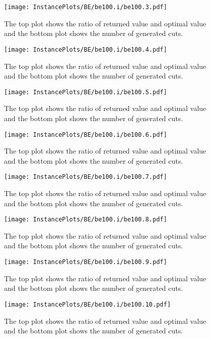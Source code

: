 \documentclass[10pt,a4paper]{article}
\begin{document}
\begin{figure}[H]
\texttt{[image: InstancePlots/BE/be100.i/be100.3.pdf]}
\caption{The top plot shows the ratio of returned value and optimal value     and the bottom plot shows the number of generated cuts.}
\end{figure}

\begin{figure}[H]
\texttt{[image: InstancePlots/BE/be100.i/be100.4.pdf]}
\caption{The top plot shows the ratio of returned value and optimal value     and the bottom plot shows the number of generated cuts.}
\end{figure}

\begin{figure}[H]
\texttt{[image: InstancePlots/BE/be100.i/be100.5.pdf]}
\caption{The top plot shows the ratio of returned value and optimal value     and the bottom plot shows the number of generated cuts.}
\end{figure}

\begin{figure}[H]
\texttt{[image: InstancePlots/BE/be100.i/be100.6.pdf]}
\caption{The top plot shows the ratio of returned value and optimal value     and the bottom plot shows the number of generated cuts.}
\end{figure}

\begin{figure}[H]
\texttt{[image: InstancePlots/BE/be100.i/be100.7.pdf]}
\caption{The top plot shows the ratio of returned value and optimal value     and the bottom plot shows the number of generated cuts.}
\end{figure}

\begin{figure}[H]
\texttt{[image: InstancePlots/BE/be100.i/be100.8.pdf]}
\caption{The top plot shows the ratio of returned value and optimal value     and the bottom plot shows the number of generated cuts.}
\end{figure}

\begin{figure}[H]
\texttt{[image: InstancePlots/BE/be100.i/be100.9.pdf]}
\caption{The top plot shows the ratio of returned value and optimal value     and the bottom plot shows the number of generated cuts.}
\end{figure}

\begin{figure}[H]
\texttt{[image: InstancePlots/BE/be100.i/be100.10.pdf]}
\caption{The top plot shows the ratio of returned value and optimal value     and the bottom plot shows the number of generated cuts.}
\end{figure}
\end{document}
